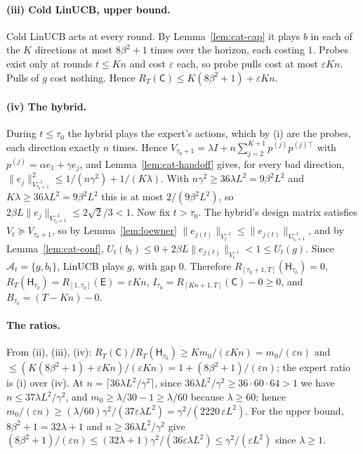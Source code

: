 \documentclass[anon]{alt2027} %
\providecommand{\qed}{\hfill\jmlrBlackBox}
\newcommand{\eps}{\varepsilon}
\newcommand{\Cold}{\mathsf{C}}
\newcommand{\Exp}{\mathsf{E}}
\newcommand{\Hyb}{\mathsf{H}}
\begin{document}
\paragraph{(iii) Cold LinUCB, upper bound.}
Cold LinUCB acts at every round. By Lemma~\ref{lem:cat-cap} it plays $b$ in
each of the $K$ directions at most $8\beta^2+1$ times over the horizon, each
costing $1$. Probes exist only at rounds $t\le Kn$ and cost $\eps$ each, so
probe pulls cost at most $\eps Kn$. Pulls of $g$ cost nothing. Hence
$R_T(\Cold)\le K(8\beta^2+1)+\eps Kn$.

\paragraph{(iv) The hybrid.}
During $t\le\tau_0$ the hybrid plays the expert's actions, which by (i) are
the probes, each direction exactly $n$ times. Hence
$V_{\tau_0+1}=\lambda I+n\sum_{j=2}^{K+1}p^{(j)}p^{(j)\top}$ with $p^{(j)}=\alpha e_1+\gamma e_j$,
and Lemma~\ref{lem:cat-handoff} gives, for every bad direction,
$\|e_j\|^2_{V_{\tau_0+1}^{-1}}\le1/(n\gamma^2)+1/(K\lambda)$. With $n\gamma^2\ge36\lambda L^2=9\beta^2L^2$
and $K\lambda\ge36\lambda L^2=9\beta^2L^2$ this is at most $2/(9\beta^2L^2)$, so
$2\beta L\|e_j\|_{V_{\tau_0+1}^{-1}}\le2\sqrt2/3<1$. Now fix $t>\tau_0$. The
hybrid's design matrix satisfies $V_t\succeq V_{\tau_0+1}$, so by
Lemma~\ref{lem:loewner} $\|e_{j(t)}\|_{V_t^{-1}}\le\|e_{j(t)}\|_{V_{\tau_0+1}^{-1}}$,
and by Lemma~\ref{lem:cat-conf}, $U_t(b_t)\le0+2\beta L\|e_{j(t)}\|_{V_t^{-1}}<1\le U_t(g)$.
Since $\mathcal A_t=\{g,b_t\}$, LinUCB plays $g$, with gap $0$. Therefore
$R_{[\tau_0+1,T]}(\Hyb_{\tau_0})=0$, $R_T(\Hyb_{\tau_0})=R_{[1,\tau_0]}(\Exp)=\eps Kn$,
$I_{\tau_0}=R_{[Kn+1,T]}(\Cold)-0\ge0$, and $B_{\tau_0}=(T-Kn)-0$.

\paragraph{The ratios.}
From (ii), (iii), (iv): $R_T(\Cold)/R_T(\Hyb_{\tau_0})\ge Km_0/(\eps Kn)=m_0/(\eps n)$
and $\le(K(8\beta^2+1)+\eps Kn)/(\eps Kn)=1+(8\beta^2+1)/(\eps n)$; the
expert ratio is (i) over (iv). At $n=\lceil36\lambda L^2/\gamma^2\rceil$, since
$36\lambda L^2/\gamma^2\ge36\cdot60\cdot64>1$ we have $n\le37\lambda L^2/\gamma^2$, and
$m_0\ge\lambda/30-1\ge\lambda/60$ because $\lambda\ge60$; hence
$m_0/(\eps n)\ge(\lambda/60)\gamma^2/(37\eps\lambda L^2)=\gamma^2/(2220\,\eps L^2)$. For the
upper bound, $8\beta^2+1=32\lambda+1$ and $n\ge36\lambda L^2/\gamma^2$ give
$(8\beta^2+1)/(\eps n)\le(32\lambda+1)\gamma^2/(36\eps\lambda L^2)\le \gamma^2/(\eps L^2)$
since $\lambda\ge1$. \qed
\end{document}
